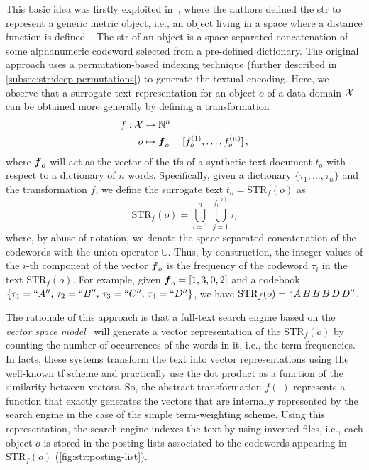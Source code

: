 This basic idea was firstly exploited in~\cite{gennaro2010approach}, where the authors defined the \acrfull{str} to represent a generic metric object, i.e., an object living in a space where a distance function is defined~\cite{zezula2006similarity}.
The \gls{str} of an object is a space-separated concatenation of some alphanumeric codeword selected from a pre-defined dictionary.
The original approach uses a permutation-based indexing technique (further described in \ref{subsec:str:deep-permutations}) to generate the textual encoding.
Here, we observe that a surrogate text representation for an object $o$ of a data domain $\mathcal{X}$ can be obtained more generally by defining a transformation
\begin{align}
	f : \mathcal{X} &\to \mathbb{N}^n\\
	o &\mapsto \boldsymbol {f}_o=[f_o^{(1)}, \dots, f_o^{(n)}] \,,
\end{align}
where $\boldsymbol {f}_o$ will act as the vector of the \glspl{tf} of a synthetic text document $t_o$ with respect to a dictionary of $n$ words.
Specifically, given a dictionary $\{\tau_1, \dots, \tau_n\}$ and the transformation $f$, we define the surrogate text $ t_o=\text{STR}_f(o)$ as
\begin{equation}
	\text{STR}_f(o)=\bigcup_{i=1}^n\,\bigcup_{j=1}^{f_o^{(i)}} \tau_i
\end{equation}
where, by abuse of notation, we denote the space-separated concatenation of the codewords with the union operator $\cup$.
Thus, by construction, the integer values of the $i$-th component of the vector $\boldsymbol {f}_o$ is the frequency of the codeword $\tau_i$ in the text $\text{STR}_f(o)$.
For example, given $\boldsymbol {f}_o=[1,3,0,2]$ and a codebook $\{\tau_1=``A'',\,  \tau_2=``B'',\, \tau_3=``C'', \,\tau_4=``D''\}$, we have $\text{STR}_f(o)=``A \, B \, B \, B \, D \, D''$.

The rationale of this approach is that a full-text search engine based on the \emph{vector space model}~\cite{salton1986introduction} will generate a vector representation of the $\text{STR}_f(o)$ by counting the number of occurrences of the words in it, i.e., the term frequencies.
In facts, these systems transform the text into vector representations using the well-known \gls{tf} scheme and practically use the dot product as a function of the similarity between vectors.
So, the abstract transformation $f(\cdot)$ represents a function that exactly generates the vectors that are internally represented by the search engine in the case of the simple term-weighting scheme.
Using this representation, the search engine indexes the text by using inverted files, i.e., each object $o$ is stored in the posting lists associated to the codewords appearing in $\text{STR}_f(o)$ (\ref{fig:str:posting-list}).

